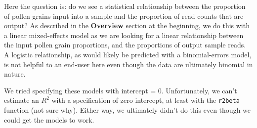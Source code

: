 \documentclass[
]{article}
\begin{document}
Here the question is: do we see a statistical relationship between the
proportion of pollen grains input into a sample and the proportion of
read counts that are output? As described in the \textbf{Overview}
section at the beginning, we do this with a linear mixed-effects model
as we are looking for a linear relationship between the input pollen
grain proportions, and the proportions of output sample reads. A
logistic relationship, as would likely be predicted with a
binomial-errors model, is not helpful to an end-user here even though
the data are ultimately binomial in nature.

We tried specifying these models with intercept = 0. Unfortunately, we
can't estimate an \(R^2\) with a specification of zero intercept, at
least with the \texttt{r2beta} function (not sure why). Either way, we
ultimately didn't do this even though we could get the models to work.
\end{document}
